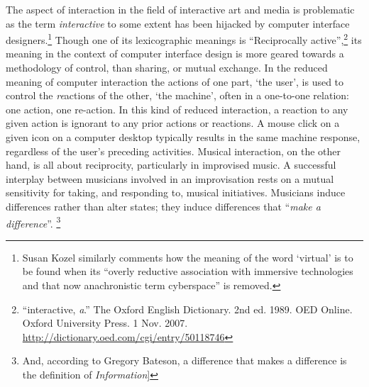 The aspect of interaction in the field of interactive art and media is problematic as the term \emph{interactive} to some extent has been hijacked by computer interface designers.\footnote{Susan Kozel similarly comments how the meaning of the word `virtual' is to be found when its ``overly reductive association with immersive technologies and that now anachronistic term cyberspace'' is removed.} Though one of its lexicographic meanings is ``Reciprocally active'',\footnote{``interactive, \textit{a}.'' The Oxford English Dictionary. 2nd ed. 1989. OED Online. Oxford University Press. 1 Nov. 2007. \url{http://dictionary.oed.com/cgi/entry/50118746}} its meaning in the context of computer interface design is more geared towards a methodology of control, than sharing, or mutual exchange. In the reduced meaning of computer interaction the actions of one part, `the user', is used to control the \emph{re}actions of the other, `the machine', often in a one-to-one relation: one action, one re-action. In this kind of reduced interaction, a reaction to any given action is ignorant to any prior actions or reactions. A mouse click on a given icon on a computer desktop typically results in the same machine response, regardless of the user's preceding activities. Musical interaction, on the other hand, is all about reciprocity, particularly in improvised music. \parencite[See for example][]{monson96} A successful interplay between musicians involved in an improvisation rests on a mutual sensitivity for taking, and responding to, musical initiatives. Musicians induce differences rather than alter states; they induce differences that ``\emph{make a difference}''. \footnote{And, according to Gregory Bateson, a difference that makes a difference is the definition of \emph{Information}]\parencite[92]{Bateson}} 
